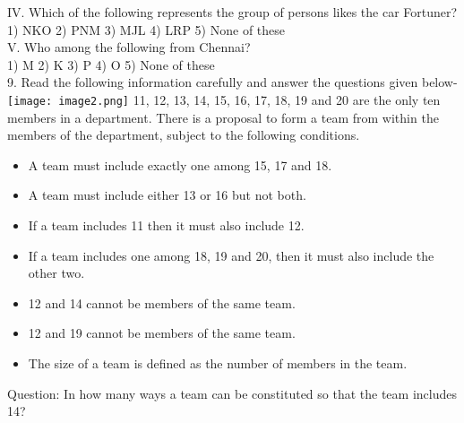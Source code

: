 \documentclass[
]{article}
\begin{document}
IV. Which of the following represents the group of persons likes the car Fortuner?\\
1) NKO \hspace{2mm}2) PNM \hspace{2mm}3) MJL \hspace{2mm}4) LRP \hspace{2mm}5) None of these\\

V. Who among the following from Chennai?\\
1) M \hspace{2mm}2) K \hspace{2mm}3) P \hspace{2mm}4) O \hspace{2mm}5) None of these\\

9. Read the following information carefully and answer the questions given below-\\
\texttt{[image: image2.png]}
11, 12, 13, 14, 15, 16, 17, 18, 19 and 20 are the only ten members in a department. There is a
proposal to form a team from within the members of the department, subject to the
following conditions.\\
\begin{itemize}
    \item A team must include exactly one among 15, 17 and 18.
\item A team must include either 13 or 16 but not both.
\item If a team includes 11 then it must also include 12.
\item If a team includes one among 18, 19 and 20, then it must also include the other two.
\item 12 and 14 cannot be members of the same team.
\item 12 and 19 cannot be members of the same team.
\item The size of a team is defined as the number of members in the team.
\end{itemize}

Question: In how many ways a team can be constituted so that the team includes 14?\\
\end{document}

